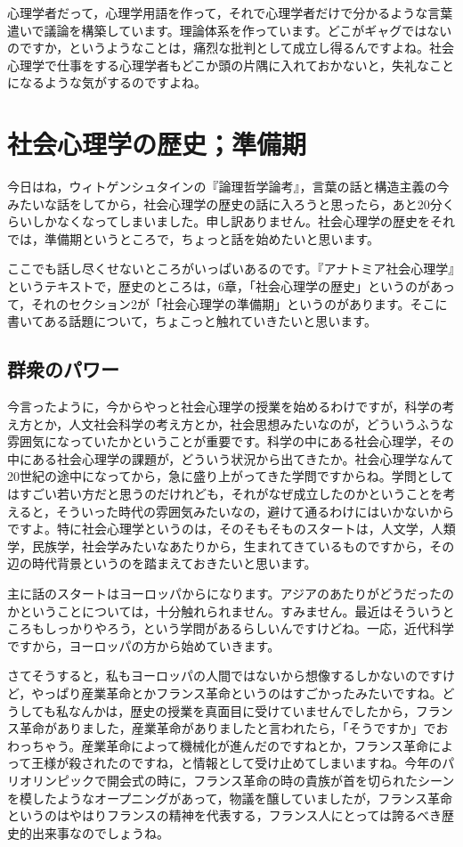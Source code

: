 \documentclass{ltjsbook}
\begin{document}
心理学者だって，心理学用語を作って，それで心理学者だけで分かるような言葉遣いで議論を構築しています。理論体系を作っています。どこがギャグではないのですか，というようなことは，痛烈な批判として成立し得るんですよね。社会心理学で仕事をする心理学者もどこか頭の片隅に入れておかないと，失礼なことになるような気がするのですよね。

\section{社会心理学の歴史；準備期}
今日はね，ウィトゲンシュタインの『論理哲学論考』，言葉の話と構造主義の今みたいな話をしてから，社会心理学の歴史の話に入ろうと思ったら，あと20分くらいしかなくなってしまいました。申し訳ありません。社会心理学の歴史をそれでは，準備期というところで，ちょっと話を始めたいと思います。

ここでも話し尽くせないところがいっぱいあるのです。『アナトミア社会心理学』というテキストで，歴史のところは，6章，「社会心理学の歴史」というのがあって，それのセクション2が「社会心理学の準備期」というのがあります。そこに書いてある話題について，ちょこっと触れていきたいと思います。

\subsection{群衆のパワー}

今言ったように，今からやっと社会心理学の授業を始めるわけですが，科学の考え方とか，人文社会科学の考え方とか，社会思想みたいなのが，どういうふうな雰囲気になっていたかということが重要です。科学の中にある社会心理学，その中にある社会心理学の課題が，どういう状況から出てきたか。社会心理学なんて20世紀の途中になってから，急に盛り上がってきた学問ですからね。学問としてはすごい若い方だと思うのだけれども，それがなぜ成立したのかということを考えると，そういった時代の雰囲気みたいなの，避けて通るわけにはいかないからですよ。特に社会心理学というのは，そのそもそものスタートは，人文学，人類学，民族学，社会学みたいなあたりから，生まれてきているものですから，その辺の時代背景というのを踏まえておきたいと思います。

主に話のスタートはヨーロッパからになります。アジアのあたりがどうだったのかということについては，十分触れられません。すみません。最近はそういうところもしっかりやろう，という学問があるらしいんですけどね。一応，近代科学ですから，ヨーロッパの方から始めていきます。

さてそうすると，私もヨーロッパの人間ではないから想像するしかないのですけど，やっぱり産業革命とかフランス革命というのはすごかったみたいですね。どうしても私なんかは，歴史の授業を真面目に受けていませんでしたから，フランス革命がありました，産業革命がありましたと言われたら，「そうですか」でおわっちゃう。産業革命によって機械化が進んだのですねとか，フランス革命によって王様が殺されたのですね，と情報として受け止めてしまいますね。今年のパリオリンピックで開会式の時に，フランス革命の時の貴族が首を切られたシーンを模したようなオープニングがあって，物議を醸していましたが，フランス革命というのはやはりフランスの精神を代表する，フランス人にとっては誇るべき歴史的出来事なのでしょうね。
\end{document}
